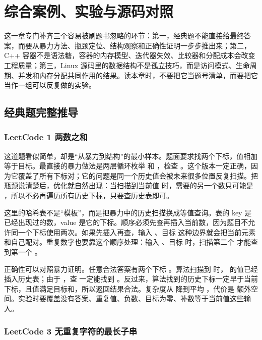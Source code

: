 \chapter{综合案例、实验与源码对照}

这一章专门补齐三个容易被刷题书忽略的环节：第一，经典题不能直接给最终答案，而要从暴力方法、瓶颈定位、结构观察和正确性证明一步步推出来；第二，C++ 容器不是语法糖，容器的内存模型、迭代器失效、比较器和分配成本会改变工程质量；第三，Linux 源码里的数据结构不是孤立技巧，而是访问模式、生命周期、并发和内存分配共同作用的结果。读本章时，不要把它当题号清单，而要把它当作一组可以反复做的实验。

\section{经典题完整推导}

\subsection{LeetCode 1 两数之和}

这道题看似简单，却是“从暴力到结构”的最小样本。题面要求找两个下标，值相加等于目标。最直接的暴力做法是两层循环枚举  和 ，检查 。这个版本一定正确，因为它覆盖了所有下标对；它的问题是同一个历史值会被未来很多位置反复扫描。把瓶颈说清楚后，优化就自然出现：当扫描到当前值  时，需要的另一个数只可能是 ，所以不必再遍历所有历史下标，只要查历史表即可。

这里的哈希表不是“模板”，而是把暴力中的历史扫描换成等值查询。表的 key 是已经出现过的数，value 是它的下标。顺序必须先查再插入当前数，因为题目不允许同一个下标使用两次。如果先插入再查，输入 \code{[3]}、目标  这种边界就会把当前元素和自己配对。重复数字也要靠这个顺序处理：输入 \code{[3,3]}、目标  时，扫描第二个  才能查到第一个 。

正确性可以对照暴力证明。任意合法答案有两个下标 。算法扫描到  时， 的值已经插入历史表；由于 ，查  一定能找到 。反过来，算法找到的历史下标一定早于当前下标，且值满足目标和，所以返回结果合法。复杂度从  降到平均 ，代价是  额外空间。实验时要覆盖没有答案、重复值、负数、目标为零、补数等于当前值这些输入。

\subsection{LeetCode 3 无重复字符的最长子串}

